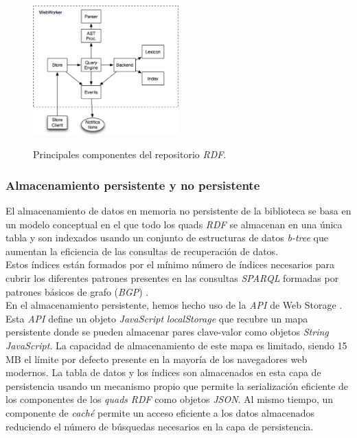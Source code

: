 \begin{figure}
\vspace{2.4in}
\caption{Principales componentes del repositorio \textit{RDF}.}
\includegraphics[width=0.5\textwidth]{figura4}
\label{figura4}
\end{figure}


\subsubsection{Almacenamiento persistente y no persistente}

El almacenamiento de datos en memoria no persistente de la biblioteca se basa en un modelo conceptual en el que todo los quads \textit{RDF} se almacenan en una \'unica tabla y son indexados usando un conjunto de estructuras de datos \textit{b-tree} que aumentan la eficiencia de las consultas de recuperaci\'on de datos.\\
Estos \'indices est\'an formados por el m\'inimo n\'umero de \'indices necesarios para cubrir los diferentes patrones presentes en las consultas \textit{SPARQL} formadas por patrones b\'asicos de grafo (\textit{BGP}) \cite{yars}.\\
En el almacenamiento persistente, hemos hecho uso de la \textit{API} de Web Storage \cite{webstorage}. Esta \textit{API} define un objeto \textit{JavaScript} \textit{localStorage} que recubre un mapa persistente donde se pueden almacenar pares clave-valor como objetos \textit{String} \textit{JavaScript}. La capacidad de almacenamiento de este mapa es limitado, siendo 15 MB el l\'imite por defecto presente en la mayor\'ia de los navegadores web modernos. La tabla de datos y los \'indices son almacenados en esta capa de persistencia usando un mecanismo propio que permite la serializaci\'on eficiente de los componentes de los \textit{quads} \textit{RDF} como objetos \textit{JSON}. Al mismo tiempo, un componente de \textit{cach\'e} permite un acceso eficiente a los datos almacenados reduciendo el n\'umero de b\'usquedas necesarios en la capa de persistencia.

